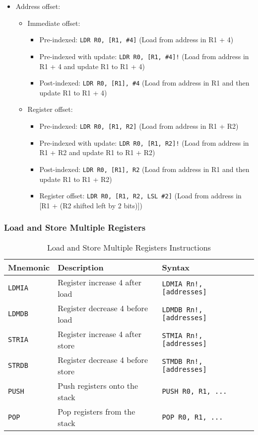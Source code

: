 \documentclass[a4paper,12pt,openany]{book}
\begin{document}
\begin{itemize}
    \item Address offset:
    \begin{itemize}
        \item Immediate offset:
        \begin{itemize}
            \item Pre-indexed: \texttt{LDR R0, [R1, \#4]} (Load from address in R1 + 4)
            \item Pre-indexed with update: \texttt{LDR R0, [R1, \#4]!} (Load from address in R1 + 4 and update R1 to R1 + 4)
            \item Post-indexed: \texttt{LDR R0, [R1], \#4} (Load from address in R1 and then update R1 to R1 + 4)
        \end{itemize}
        \item Register offset:
        \begin{itemize}
            \item Pre-indexed: \texttt{LDR R0, [R1, R2]} (Load from address in R1 + R2)
            \item Pre-indexed with update: \texttt{LDR R0, [R1, R2]!} (Load from address in R1 + R2 and update R1 to R1 + R2)
            \item Post-indexed: \texttt{LDR R0, [R1], R2} (Load from address in R1 and then update R1 to R1 + R2)
            \item Register offset: \texttt{LDR R0, [R1, R2, LSL \#2]} (Load from address in [R1 + (R2 shifted left by 2 bits)])
        \end{itemize}
    \end{itemize}
\end{itemize}

\subsubsection{Load and Store Multiple Registers}
\begin{table}[H]
    \centering
    \begin{tabular}{@{}llll@{}}
        \toprule
        Mnemonic & Description & Syntax \\
        \midrule
        \texttt{LDMIA} & Register increase 4 after load & \texttt{LDMIA Rn!, [addresses]} \\
        \texttt{LDMDB} & Register decrease 4 before load & \texttt{LDMDB Rn!, [addresses]} \\
        \texttt{STRIA} & Register increase 4 after store & \texttt{STMIA Rn!, [addresses]} \\
        \texttt{STRDB} & Register decrease 4 before store & \texttt{STMDB Rn!, [addresses]} \\
        \texttt{PUSH} & Push registers onto the stack & \texttt{PUSH {R0, R1, ...}} \\
        \texttt{POP} & Pop registers from the stack & \texttt{POP {R0, R1, ...}} \\
        \bottomrule
    \end{tabular}
    \label{tab:load_store_multiple_instructions}
    \caption{Load and Store Multiple Registers Instructions}
\end{table}
\end{document}
